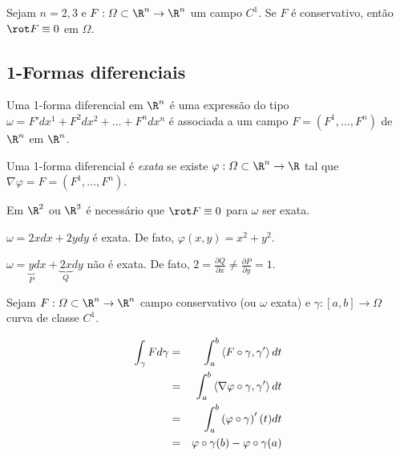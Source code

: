 \documentclass[11pt, oneside, a4paper]{gsm-l}
\begin{document}
\begin{teo}
Sejam $n=2,3$ e $F:\varOmega \subset \R^n \to \R^n$ um campo $C^1$. Se $F$ é conservativo, então $\rot F \equiv 0$ em $\varOmega$.
\end{teo}

\subsection*{1-Formas diferenciais}

\begin{defi}
  \begin{sloppypar}
    Uma 1-forma diferencial em $\R^n$ é uma expressão do tipo ${\omega  = F'dx^1  + F^2 dx^2  +  \ldots  + F^n dx^n}$ é associada a um campo $F = \left( F^1, \ldots, F^n \right)$ de $\R^n$ em $\R^n$.
  \end{sloppypar}
\end{defi}

\begin{defi}
Uma 1-forma diferencial é \textit{exata} se existe $\varphi: \varOmega \subset \R^n \to \R$ tal que $\nabla \varphi = F = \left( F^1, \ldots, F^n \right)$.
\end{defi}

Em $\R^2$ ou $\R^3$ é necessário que $\rot F \equiv 0$ para $\omega$ ser exata.

\begin{exem}
$\omega = 2xdx + 2ydy$ é exata. De fato, $\varphi(x,y) = x^2 + y^2$.
\end{exem}

\begin{exem}
$\omega  = \underbrace y_Pdx + \underbrace {2x}_Qdy$ não é exata. De fato, $2 = \frac{{\partial Q}}{{\partial x}} \ne \frac{{\partial P}}{{\partial y}} = 1$.
\end{exem}

Sejam $F:\varOmega \subset \R^n \to \R^n$ campo conservativo (ou $\omega$ exata) e $\gamma:[a,b] \to \varOmega$ curva de classe $C^1$.

\begin{eqnarray*}
  \int_\gamma {Fd\gamma }  &=& \int_a^b {\left\langle {F \circ \gamma ,\gamma '} \right\rangle dt}  \hfill \\
   &=& \int_a^b {\left\langle {\nabla \varphi  \circ \gamma ,\gamma '} \right\rangle dt}  \hfill \\
   &=& \int_a^b {\left( {\varphi  \circ \gamma } \right)'(t)dt}  \hfill \\
   &=& \varphi  \circ \gamma (b) - \varphi  \circ \gamma (a) \hfill \\ 
\end{eqnarray*}
\end{document}
